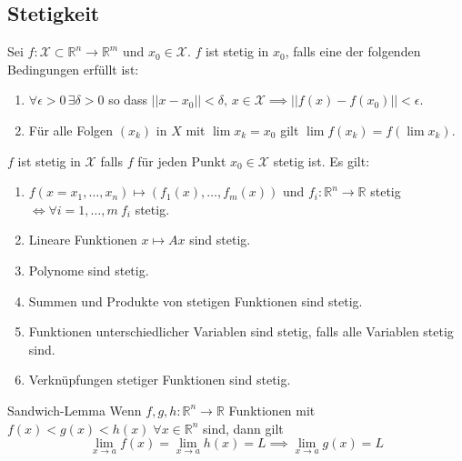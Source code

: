 \documentclass[a4paper,10pt]{article}
\def\R{\mathbb{R}}
\def\X{\mathcal{X}}
\begin{document}
\subsection{Stetigkeit}
Sei \(f: \X \subset \R^n \to \R^m\)  und \(x_0 \in \X\). \(f\) ist stetig in \(x_0\), falls eine der folgenden Bedingungen erfüllt ist:
\begin{enumerate}
  \item \(\forall \epsilon > 0\, \exists \delta > 0\) so dass \(||x - x_0|| < \delta,\, x \in \X \implies ||f(x) - f(x_0)|| < \epsilon\).
  \item Für alle Folgen \((x_k)\) in \(X\) mit \(\lim x_k = x_0\) gilt \(\lim f(x_k) = f(\lim x_k)\).
\end{enumerate}
\(f\) ist stetig in \(\X\) falls \(f\) für jeden Punkt \(x_0 \in \X\) stetig ist. Es gilt:
\begin{enumerate}
  \item \(f(x = x_1, \ldots, x_n) \mapsto (f_1(x),\ldots,f_m(x))\) und \(f_i: \R^n \to \R\) stetig \(\iff \forall i = 1, \ldots, m \ f_i\) stetig.
  \item Lineare Funktionen \(x \mapsto Ax\) sind stetig.
  \item Polynome sind stetig.
  \item Summen und Produkte von stetigen Funktionen sind stetig.
  \item Funktionen unterschiedlicher Variablen sind stetig, falls alle Variablen stetig sind.
  \item Verknüpfungen stetiger Funktionen sind stetig.
\end{enumerate}
\begin{mainbox}{Sandwich-Lemma}
  Wenn \(f, g, h: \R^n \to \R\) Funktionen mit \(f(x) < g(x) < h(x)\; \forall x \in \R^n\) sind, dann gilt
  \[\lim_{x\to a} f(x) = \lim_{x \to a} h(x) = L \implies \lim_{x\to a} g(x) = L\]
\end{mainbox}
\end{document}
